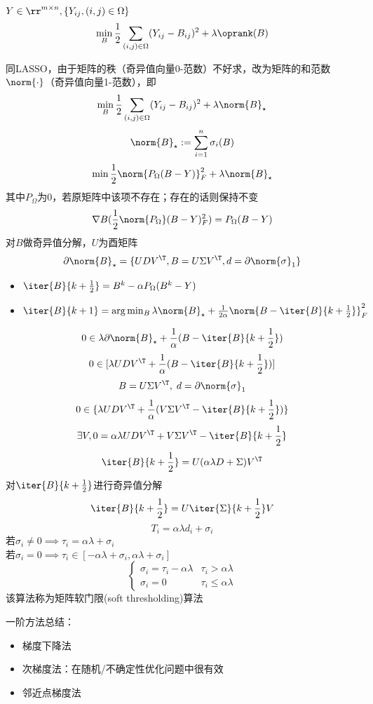 \begin{example}[矩阵补全]
    $Y\in\rr^{m\times n},\{Y_{ij},(i,j)\in\Omega\}$
    \[\min_B\frac{1}{2}\sum_{(i,j)\in\Omega}(Y_{ij}-B_{ij})^2+\lambda\oprank(B)\]
\end{example}
\begin{analysis}
    同LASSO，由于矩阵的秩（奇异值向量0-范数）不好求，改为矩阵的和范数$\norm{\cdot}$（奇异值向量1-范数），即
    \[\min_B\frac{1}{2}\sum_{(i,j)\in\Omega}(Y_{ij}-B_{ij})^2+\lambda\norm{B}_\star\]
    \[\norm{B}_\star:=\sum_{i=1}^n\sigma_i(B)\]
    \[\min\frac{1}{2}\norm{P_\Omega(B-Y)}_F^2+\lambda\norm{B}_\star\]
    其中$P_\Omega$为$0$，若原矩阵中该项不存在；存在的话则保持不变
    \[\nabla B(\frac{1}{2}\norm{P_\Omega}(B-Y)_F^2)=P_\Omega(B-Y)\]
    对$B$做奇异值分解，$U$为酉矩阵
    \[\partial\norm{B}_\star=\{UDV^\T, B=U\Sigma V^\T, d=\partial\norm{\sigma}_1\}\]
    \begin{itemize}
        \item $\iter{B}{k+\frac{1}{2}}=B^k-\alpha P_\Omega(B^k-Y)$
        \item $\iter{B}{k+1}=\arg\min_B\lambda\norm{B}_\star+\frac{1}{2\alpha}\norm{B-\iter{B}{k+\frac{1}{2}}}_F^2$
    \end{itemize}
    \[0\in\lambda\partial\norm{B}_\star+\frac{1}{\alpha}(B-\iter{B}{k+\frac{1}{2}})\]
    \[0\in[\lambda UDV^\T+\frac{1}{\alpha}(B-\iter{B}{k+\frac{1}{2}})]\]
    \[B=U\Sigma V^\T,\;d=\partial\norm{\sigma}_1\]
    \[0\in\{\lambda UDV^\T +\frac{1}{\alpha}(V\Sigma V^\T-\iter{B}{k+\frac{1}{2}})\}\]
    \[\exists V,0=\alpha\lambda UDV^\T+V\Sigma V^\T-\iter{B}{k+\frac{1}{2}}\]
    \[\iter{B}{k+\frac{1}{2}}=U(\alpha\lambda D+\Sigma)V^\T\]
    对$\iter{B}{k+\frac{1}{2}}$进行奇异值分解
    \[\iter{B}{k+\frac{1}{2}}=U\iter{\Sigma}{k+\frac{1}{2}}V\]
    \[T_i=\alpha\lambda d_i+\sigma_i\]
    若$\sigma_i\ne 0\implies \tau_i=\alpha\lambda+\sigma_i$\\
    若$\sigma_i=0\implies \tau_i\in[-\alpha\lambda+\sigma_i,\alpha\lambda+\sigma_i]$\\
    \[\begin{cases}
        \sigma_i=\tau_i-\alpha\lambda & \tau_i>\alpha\lambda\\
        \sigma_i=0 & \tau_i\leq\alpha\lambda
    \end{cases}\]
    该算法称为矩阵软门限(soft thresholding)算法
\end{analysis}

一阶方法总结：
\begin{itemize}
    \item 梯度下降法
    \item 次梯度法：在随机/不确定性优化问题中很有效
    \item 邻近点梯度法
\end{itemize}

